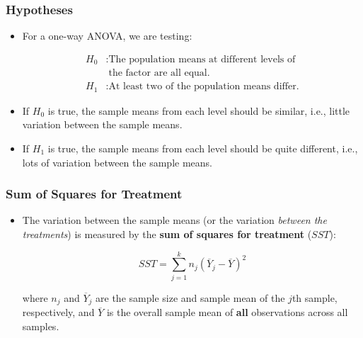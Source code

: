 \documentclass[12pt]{beamer}
\begin{document}
\begin{frame}
	\frametitle{Hypotheses}
	
	\begin{itemize}[label={\color{blue}$\blacktriangleright$}]
		\item For a one-way ANOVA, we are testing:
		
		\begin{align*}
			H_0 &: \text{The population means at different levels of} \\
			&\phantom{:} \text{the factor are all equal.} \\
			H_1 &: \text{At least two of the population means differ.}
		\end{align*}
		
		\item If $H_0$ is true, the sample means from each level should be similar, i.e., little variation between the sample means.
		
		\item If $H_1$ is true, the sample means from each level should be quite different, i.e., lots of variation between the sample means.
	\end{itemize}
	
\end{frame}
\begin{frame}
	\frametitle{Sum of Squares for Treatment}
	
	\begin{itemize}[label={\color{blue}$\blacktriangleright$}]
		\item The variation between the sample means (or the variation \textit{between the treatments}) is measured by the \textbf{sum of squares for treatment} ($SST$):
		
		\begin{equation*}
			SST = \sum_{j=1}^k n_j (\overline{Y}_j - \overline{Y})^2
		\end{equation*}
		
		where $n_j$ and $\overline{Y}_j$ are the sample size and sample mean of the $j$th sample, respectively, and $\overline{Y}$ is the overall sample mean of \textbf{all} observations across all samples.
	\end{itemize}
	
\end{frame}
\end{document}

